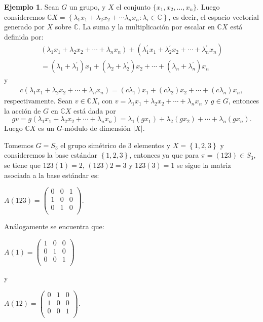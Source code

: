 \documentclass[12pt]{book}
\theoremstyle{definition}
\newtheorem{example}[theorem]{Ejemplo}
\newcounter{in}
\newcounter{ini}
\begin{document}
\begin{example}
\label{ex_mod_per}
Sean $G$ un grupo, y $X$ el conjunto
$\{x_{1},x_{2},\ldots,x_{n}\}$. Luego consideremos
$\mathbb{C} X = \left \{ \lambda_1 x_{1} +\lambda_2 x_{2} + \cdots
  \lambda_n x_{n} : \lambda_{i} \in \mathbb{C} \right \}$, es decir,
el espacio vectorial generado por $X$ sobre $\mathbb{C}$.  La suma y
la multiplicación por escalar en $\mathbb{C} X$ está definida por:
  \begin{eqnarray*}
    (\lambda_{1}x_{1}+\lambda_{2}x_{2}+\cdots
    +\lambda_{n}x_{n})+(\lambda^{'}_{1}x_{1}+\lambda^{'}_{2}x_{2}+\cdots +\lambda^{'}_{n}x_{n})\\
    =(\lambda_{1}+\lambda^{'}_{1})x_{1}+(\lambda_{2}+\lambda^{'}_{2})x_{2}+\cdots
    +(\lambda_{n}+\lambda^{'}_{n})x_{n}
  \end{eqnarray*}
  y
  \begin{eqnarray*}
    c(\lambda_{1}x_{1}+\lambda_{2}x_{2}+\cdots +\lambda_{n}x_{n})=(c\lambda_{1})x_{1}+(c\lambda_{2})x_{2}+\cdots +(c\lambda_{n})x_{n},
  \end{eqnarray*}
  respectivamente. Sean $v\in \mathbb{C}X$, con
  $v=\lambda_{1}x_{1}+\lambda_{2}x_{2}+\cdots+\lambda_{n}x_{n}$ y $g\in G$, entonces la acción de $G$ en $\mathbb{C}X$ está dada por
  \begin{equation*}
    gv=g(\lambda_{1}x_{1}+\lambda_{2}x_{2}+\cdots +\lambda_{n}x_{n})=\lambda_{1}(gx_{1})+\lambda_{2}(gx_{2})+\cdots +\lambda_{n}(gx_{n}).
\end{equation*}
Luego $\mathbb{C}X$ es un $G$-módulo de dimensión $|X|$. 

Tomemos $G = S_3$ el grupo simétrico de $3$ elementos y
$X = \left \{ 1, 2, 3 \right \}$ y consideremos la base estándar
$\left \{ 1, 2, 3 \right \}$, entonces ya que para
$\pi = (123) \in S_3$, se tiene que $123(1) = 2$, $(123)2 = 3$ y
$123(3) = 1$ se sigue la matriz asociada a la base estándar es:
\begin{center}  
     $A(123)=\begin{pmatrix}
       0 & 0 & 1 \\
       1 & 0 & 0 \\
       0 & 1 & 0 \\
      \end{pmatrix}.$
\end{center}
Análogamente se encuentra que:
\begin{center}  
     $A(1)=\begin{pmatrix}
       1 & 0 & 0 \\
       0 & 1 & 0 \\
       0 & 0 & 1 \\
      \end{pmatrix}$
\end{center}
y
\begin{center}  
     $A(12)=\begin{pmatrix}
       0 & 1 & 0 \\
       1 & 0 & 0 \\
       0 & 0 & 1 \\
      \end{pmatrix}.$
\end{center}
\end{example}
\end{document}
